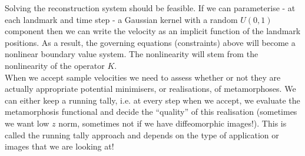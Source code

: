 \documentclass{article}
\begin{document}
Solving the reconstruction system should be feasible.  If we can parameterise -
at each landmark and time step - a Gaussian kernel with a random $U(0,1)$
component then we can write the velocity as an implicit function of the landmark
positions. As a result, the governing equations (constraints) above will become
a nonlinear boundary value system. The nonlinearity will stem from the
nonlinearity of the operator $K$.\\

When we accept sample velocities we need to
assess whether or not they are actually appropriate potential minimisers, or
realisations, of metamorphoses. We can either keep a running tally, i.e. at
every step when we accept, we evaluate the metamorphosis functional and decide
the ``quality'' of this realisation (sometimes we want low $z$ norm, sometimes
not if we have diffeomorphic images!). This is called the running tally
approach and depends on the type of application or images that we are looking
at!



\end{document}
